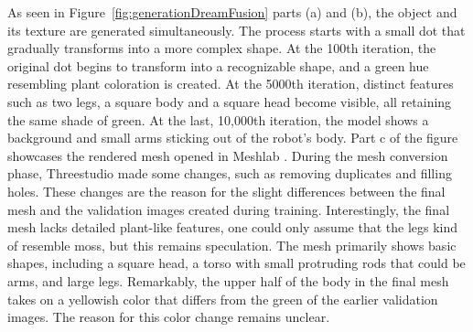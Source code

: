 As seen in Figure~\ref{fig:generationDreamFusion} parts (a) and (b), the object and its texture are generated simultaneously. The process starts with a small dot that gradually transforms into a more complex shape. At the 100th iteration, the original dot begins to transform into a recognizable shape, and a green hue resembling plant coloration is created. At the 5000th iteration, distinct features such as two legs, a square body and a square head become visible, all retaining the same shade of green. At the last, 10,000th iteration, the model shows a background and small arms sticking out of the robot's body.
Part c of the figure showcases the rendered mesh opened in Meshlab \citep{meshLab}. During the mesh conversion phase, Threestudio made some changes, such as removing duplicates and filling holes. These changes are the reason for the slight differences between the final mesh and the validation images created during training. Interestingly, the final mesh lacks detailed plant-like features, one could only assume that the legs kind of resemble moss, but this remains speculation. The mesh primarily shows basic shapes, including a square head, a torso with small protruding rods that could be arms, and large legs. Remarkably, the upper half of the body in the final mesh takes on a yellowish color that differs from the green of the earlier validation images. The reason for this color change remains unclear.